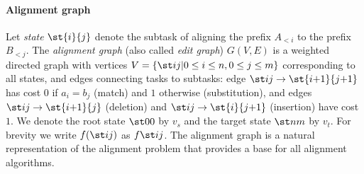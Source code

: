 \paragraph{Alignment graph}
Let \emph{state} $\st{i}{j}$ denote the subtask of aligning the prefix $A_{<i}$
to the prefix $B_{<j}$. The \emph{alignment graph} (also called \emph{edit
graph}) $G(V,E)$ is a weighted directed graph with vertices $V = \{\st ij \vert
{0\leq i \leq n}, {0\leq j\leq m}\}$ corresponding to all states, and edges
connecting tasks to subtasks: edge ${\st ij \to \st{i{+}1}{j{+}1}}$ has cost $0$
if ${a_i = b_j}$ (match) and $1$ otherwise (substitution), and edges ${\st ij
\to \st{i{+}1}{j}}$ (deletion) and ${\st ij \to\st{i}{j{+}1}}$ (insertion) have
cost $1$. We denote the root state $\st 00$ by $v_s$ and the target state $\st
nm$ by $v_t$. For brevity we write $f(\st ij)$ as $f \st ij$. The alignment graph is
a natural representation of the alignment problem that provides a base for all
alignment algorithms.
